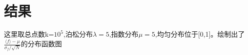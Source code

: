\documentclass{article}
\begin{document}
	\section{结果}
	这里取总点数k=$ 10^5 $,泊松分布$ \lambda=5 $,指数分布$ \mu=5 $,均匀分布位于[0,1]。绘制出了$ \frac{\langle f\rangle-\mu}{\sigma_f/\sqrt{N}} $的分布函数图
	\begin{figure}[!h]
		\centering

\end{figure}
\end{document}
